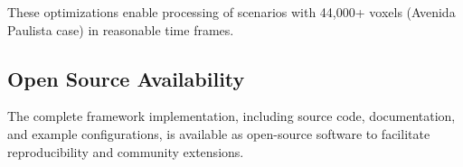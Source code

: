 These optimizations enable processing of scenarios with 44,000+ voxels (Avenida Paulista case) in reasonable time frames.

\subsection{Open Source Availability}

The complete framework implementation, including source code, documentation, and example configurations, is available as open-source software to facilitate reproducibility and community extensions.



